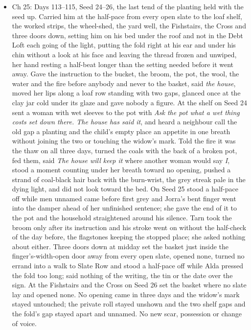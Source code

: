 \documentclass{design/chronicle}
\begin{document}
{\begin{itemize}[leftmargin=1.4em,itemsep=1pt,topsep=3pt,parsep=0pt]
\end{itemize}

\begin{itemize}[leftmargin=1.4em,itemsep=1pt,topsep=3pt,parsep=0pt]

\item Ch 25: Days 113–115, Seed 24–26, the last tend of the planting held with the seed up. Carried him at the half-pace from every open slate to the loaf shelf, the worked strips, the wheel-shed, the yard well, the Fishstairs, the Cross and three doors down, setting him on his bed under the roof and not in the Debt Loft each going of the light, putting the fold right at his ear and under his chin without a look at his face and leaving the thread frozen and unwiped, her hand resting a half-beat longer than the setting needed before it went away. Gave the instruction to the bucket, the broom, the pot, the wool, the water and the fire before anybody and never to the basket, said \emph{the house}, moved her lips along a loaf row standing with two gaps, glanced once at the clay jar cold under its glaze and gave nobody a figure. At the shelf on Seed 24 sent a woman with wet sleeves to the pot with \emph{Ask the pot what a wet thing costs set down there. The house has said it}, and heard a neighbour call the old gap a planting and the child’s empty place an appetite in one breath without joining the two or touching the widow’s mark. Told the fire it was the thaw on all three days, turned the coals with the back of a broken pot, fed them, said \emph{The house will keep it} where another woman would say \emph{I}, stood a moment counting under her breath toward no opening, pushed a strand of coal-black hair back with the burn-wrist, the grey streak pale in the dying light, and did not look toward the bed. On Seed 25 stood a half-pace off while men unnamed came before first grey and Jorra’s bent finger went into the damper ahead of her unfinished sentence; she gave the end of it to the pot and the household straightened around his silence. Tarn took the broom only after its instruction and his stroke went on without the half-check of the day before, the flagstones keeping the stopped place; she asked nothing about either. Three doors down at midday set the basket just inside the finger’s-width-open door away from every open slate, opened none, turned no errand into a walk to Slate Row and stood a half-pace off while Alda pressed the fold too long; said nothing of the writing, the tin or the date over the sign. At the Fishstairs and the Cross on Seed 26 set the basket where no slate lay and opened none. No opening came in three days and the widow’s mark stayed untouched; the private roll stayed unshown and the two shelf gaps and the fold’s gap stayed apart and unnamed. No new scar, possession or change of voice.


\end{itemize}}
\end{document}
